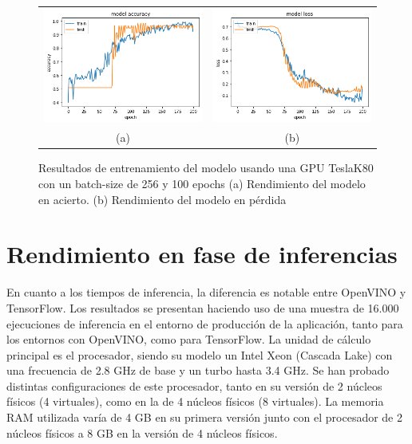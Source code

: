 \begin{figure}
    \centering
    \begin{tabular}{cc}
        \includegraphics[height=0.35\textwidth]{images/chapter5/batch_256_200_epoch.png} &
        \includegraphics[height=0.35\textwidth]{images/chapter5/batch_256_200_epoch_loss.png}\\
        (a) & (b)\\
    \end{tabular}
    \label{fig:Resultados de entrenamiento con un batch-size de 256 y 200 epochs}
    \caption{Resultados de entrenamiento del modelo usando una GPU TeslaK80 con un batch-size de 256 y 100 epochs (a) Rendimiento del modelo en acierto. (b) Rendimiento del modelo en pérdida}
\end{figure}


\section{Rendimiento en fase de inferencias}\label{sec:ren-dimiento-en-fase-de-inferencias}
En cuanto a los tiempos de inferencia, la diferencia es notable entre OpenVINO y TensorFlow.
Los resultados se presentan haciendo uso de una muestra de 16.000 ejecuciones de inferencia en el entorno de producción de la aplicación, tanto para los entornos con OpenVINO, como para TensorFlow.
La unidad de cálculo principal es el procesador, siendo su modelo un Intel Xeon (Cascada Lake) con una frecuencia de 2.8 GHz de base y un turbo hasta 3.4 GHz.
Se han probado distintas configuraciones de este procesador, tanto en su versión de 2 núcleos físicos (4 virtuales), como en la de 4 núcleos físicos (8 virtuales).
La memoria RAM utilizada varía de 4 GB en su primera versión junto con el procesador de 2 núcleos físicos a 8 GB en la versión de 4 núcleos físicos.


